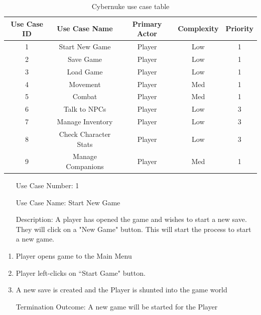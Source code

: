 \documentclass[10pt,conference,onecolumn,compsoc]{IEEEtran}
\begin{document}
\begin{table}
\centering
\begin{tabular}{|c|c|c|c|c|}
\hline
Use Case ID & Use Case Name & Primary Actor & Complexity & Priority \\
\hline \hline
1 & Start New Game & Player & Low & 1\\
\hline
2 & Save Game & Player & Low & 1\\
\hline
3 & Load Game & Player & Low & 1\\
\hline
4 & Movement & Player & Med & 1\\
\hline
5 & Combat & Player & Med & 1\\
\hline
6 & Talk to NPCs & Player & Low & 3\\
\hline
7 & Manage Inventory & Player & Low & 3\\
\hline
8 & Check Character Stats & Player & Low & 3\\
\hline
9 & Manage Companions & Player & Med & 1\\
\hline

\end{tabular}
\caption{Cybernuke use case table}
\label{tab:useCaseIndex}
\end{table}


\begin{itemize}
\item[Use Case Number:] 1
\item[Use Case Name:] Start New Game
\item[Description:] A player has opened the game and wishes to start a new save. They will click on a "New Game" button. This will start the process to start a new game.
\end{itemize}


\begin{enumerate}
\item Player opens game to the Main Menu
\item Player left-clicks on ``Start Game" button.
\item A new save is created and the Player is shunted into the game world
\item[Termination Outcome:] A new game will be started for the Player
\end{enumerate}


\end{document}
